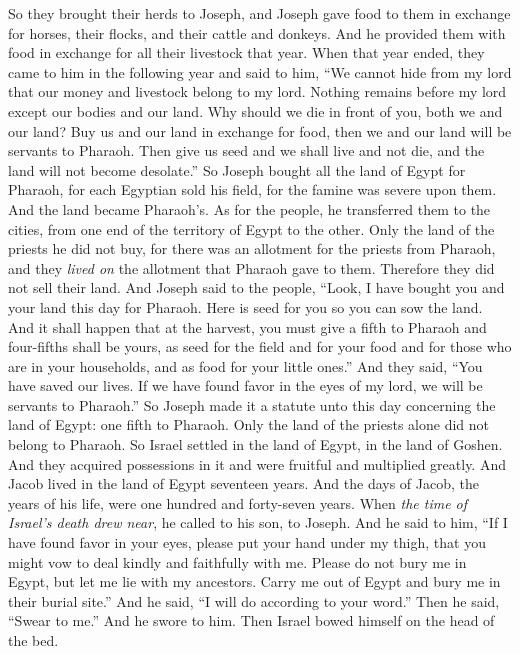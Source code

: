 \begin{biblechapter}
\verse So they brought their herds to Joseph, and Joseph gave food to them in exchange for horses, their flocks, and their cattle and donkeys. And he provided them with food in exchange for all their livestock that year.
\verse When that year ended, they came to him in the following year and said to him, “We cannot hide from my lord that our money and livestock belong to my lord. Nothing remains before my lord except our bodies and our land.
\verse Why should we die in front of you, both we and our land? Buy us and our land in exchange for food, then we and our land will be servants to Pharaoh. Then give us seed and we shall live and not die, and the land will not become desolate.”
\verse So Joseph bought all the land of Egypt for Pharaoh, for each Egyptian sold his field, for the famine was severe upon them. And the land became Pharaoh’s.
\verse As for the people, he transferred them to the cities, from one end of the territory of Egypt to the other.
\verse Only the land of the priests he did not buy, for there was an allotment for the priests from Pharaoh, and they \textit{lived on} the allotment that Pharaoh gave to them. Therefore they did not sell their land.
\verse And Joseph said to the people, “Look, I have bought you and your land this day for Pharaoh. Here is seed for you so you can sow the land.
\verse And it shall happen that at the harvest, you must give a fifth to Pharaoh and four-fifths shall be yours, as seed for the field and for your food and for those who are in your households, and as food for your little ones.”
\verse And they said, “You have saved our lives. If we have found favor in the eyes of my lord, we will be servants to Pharaoh.”
\verse So Joseph made it a statute unto this day concerning the land of Egypt: one fifth to Pharaoh. Only the land of the priests alone did not belong to Pharaoh.
\verse So Israel settled in the land of Egypt, in the land of Goshen. And they acquired possessions in it and were fruitful and multiplied greatly.
\verse And Jacob lived in the land of Egypt seventeen years. And the days of Jacob, the years of his life, were one hundred and forty-seven years.
\verse When \textit{the time of Israel’s death drew near}, he called to his son, to Joseph. And he said to him, “If I have found favor in your eyes, please put your hand under my thigh, that you might vow to deal kindly and faithfully with me. Please do not bury me in Egypt,
\verse but let me lie with my ancestors. Carry me out of Egypt and bury me in their burial site.” And he said, “I will do according to your word.”
\verse Then he said, “Swear to me.” And he swore to him. Then Israel bowed himself on the head of the bed.
\end{biblechapter}

